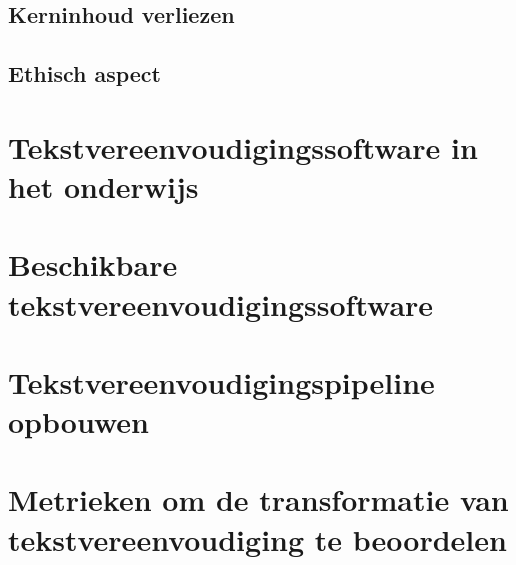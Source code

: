\subsection{Kerninhoud verliezen}

\subsection{Ethisch aspect}

\cite{Gooding2022}

\section{Tekstvereenvoudigingssoftware in het onderwijs}

\section{Beschikbare tekstvereenvoudigingssoftware}

\section{Tekstvereenvoudigingspipeline opbouwen}

\section{Metrieken om de transformatie van tekstvereenvoudiging te beoordelen}





